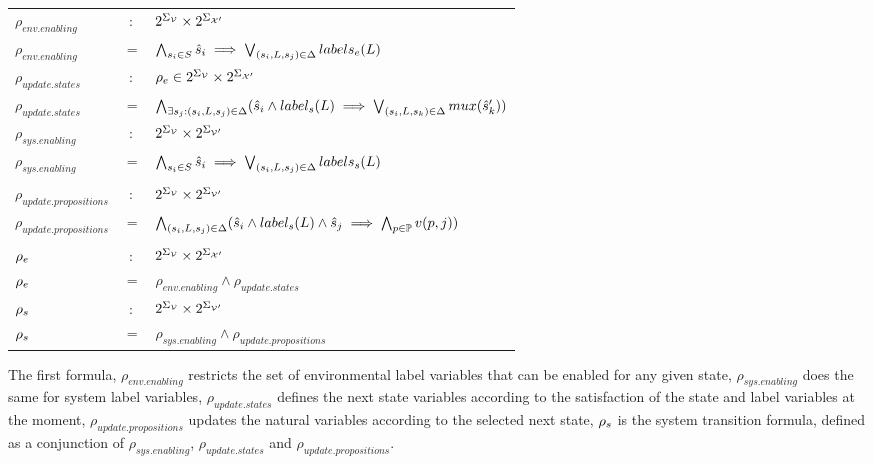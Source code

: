 \vspace{1em}
\begin{tabular}{ l c l }
	$\rho_{env.enabling}$&$:$&$2^{\Sigma_{{\mathcal{V}}}} \times 2^{\Sigma_{{\mathcal{X}}'}}$\\
	$\rho_{env.enabling}$ &$=$& $\bigwedge_{s_i \in S} \hat{s}_{i} \implies \bigvee_{(s_i,L,s_j) \in \Delta}labels_e(L)$\\
	$\rho_{update.states}$&$:$&${\rho_e}  \in 2^{\Sigma_{{\mathcal{V}}}} \times 2^{\Sigma_{{\mathcal{X}}'}}$\\
	$\rho_{update.states}$&$=$&$\bigwedge_{\exists s_j:(s_i,L,s_j) \in \Delta} (\hat{s}_{i} \wedge label_s(L) \implies \bigvee_{(s_i,L,s_k) \in \Delta}mux(\hat{s}_{k}') ) $\\	
	$\rho_{sys.enabling}$&$:$&$2^{\Sigma_{{\mathcal{V}}}} \times 2^{\Sigma_{{\mathcal{V}}'}}$\\
	$\rho_{sys.enabling}$ &$=$& $\bigwedge_{s_i \in S} \hat{s}_{i} \implies \bigvee_{(s_i,L,s_j) \in \Delta}labels_s(L)$\\
	&&\\
	$\rho_{update.propositions}$&$:$&$2^{\Sigma_{{\mathcal{V}}}} \times 2^{\Sigma_{{\mathcal{V}}'}}$\\
	$\rho_{update.propositions}$&$=$&$\bigwedge_{(s_i,L,s_j) \in \Delta} (\hat{s}_{i} \wedge label_s(L) \wedge \hat{s}_{j} \implies \bigwedge_{p \in \mathbb{P}}v(p,j) )$\\
	&&\\
	${\rho_e}$&$:$&$2^{\Sigma_{{\mathcal{V}}}} \times 2^{\Sigma_{{\mathcal{X}}'}}$\\
	${\rho_e}$&$=$&$\rho_{env.enabling} \wedge  \rho_{update.states}$\\		
	${\rho_s}$&$:$&$2^{\Sigma_{{\mathcal{V}}}} \times 2^{\Sigma_{{\mathcal{V}}'}}$\\	
	${\rho_s}$&$=$&$\rho_{sys.enabling} \wedge  \rho_{update.propositions}$\\	
\end{tabular}
\vspace{1em}

The first formula, $\rho_{env.enabling}$ restricts the set of environmental label variables that can be enabled for any given state, $\rho_{sys.enabling}$ does the same for system label variables, $\rho_{update.states}$ defines the next state variables according to the satisfaction of the state and label variables at the moment, $\rho_{update.propositions}$ updates the natural variables according to the selected next state, ${\rho_s}$ is the system transition formula, defined as a conjunction of $\rho_{sys.enabling}$, $\rho_{update.states}$ and $\rho_{update.propositions}$.
%
%

